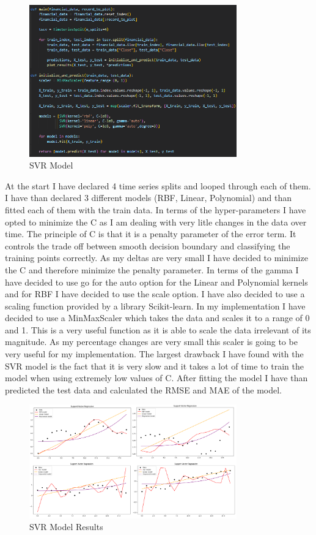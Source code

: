 \documentclass{imc-inf}
\begin{document}
	\begin{figure}[h]
		\centering
		\includegraphics[width=0.8\textwidth]{svr_code.png}
		\caption{SVR Model}
		\label{fig:svr_model}
	\end{figure}
	At the start I have declared 4 time series splits and looped through each of them. I have than declared 3 different models (RBF, Linear, Polynomial) and than fitted each of them with the train data.
	In terms of the hyper-parameters I have opted to minimize the C as I am dealing with very litle changes in the data over time. The principle of C is that it is a penalty parameter of the error term.
	It controls the trade off between smooth decision boundary and classifying the training points correctly. As my deltas are very small I have decided to minimize the C and therefore minimize the penalty parameter. 
	In terms of the gamma I have decided to use go for the auto option for the Linear and Polynomial kernels and for RBF I have decided to use the scale option. I have also decided to use a scaling function
	provided by a library Scikit-learn. In my implementation I have decided to use a MinMaxScaler which takes the data and scales it to a range of 0 and 1. This is a very useful function as it is able to scale the data 
	irrelevant of its magnitude. As my percentage changes are very small this scaler is going to be very useful for my implementation.
	The largest drawback I have found with the SVR model is the fact that it is very slow and it takes a lot of time to train the model when using extremely low values of C. 
	After fitting the model I have than predicted the test data and calculated the RMSE and MAE of the model.
	\begin{figure}[h]
		\centering
		\includegraphics[width=0.8\textwidth]{svr_chart.png}
		\caption{SVR Model Results}
		\label{fig:svr_model_plots}
	\end{figure}
\end{document}
